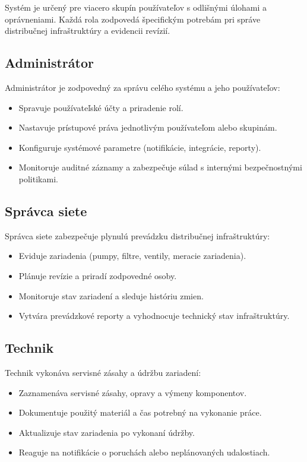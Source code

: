 Systém je určený pre viacero skupín používateľov s odlišnými úlohami a oprávneniami. Každá rola zodpovedá špecifickým potrebám pri správe distribučnej infraštruktúry a evidencii revízií.

\subsection{Administrátor}

Administrátor je zodpovedný za správu celého systému a jeho používateľov:

\begin{itemize}
    \item Spravuje používateľské účty a priradenie rolí.
    \item Nastavuje prístupové práva jednotlivým používateľom alebo skupinám.
    \item Konfiguruje systémové parametre (notifikácie, integrácie, reporty).
    \item Monitoruje auditné záznamy a zabezpečuje súlad s internými bezpečnostnými politikami.
\end{itemize}

\subsection{Správca siete}

Správca siete zabezpečuje plynulú prevádzku distribučnej infraštruktúry:

\begin{itemize}
    \item Eviduje zariadenia (pumpy, filtre, ventily, meracie zariadenia).
    \item Plánuje revízie a priradí zodpovedné osoby.
    \item Monitoruje stav zariadení a sleduje históriu zmien.
    \item Vytvára prevádzkové reporty a vyhodnocuje technický stav infraštruktúry.
\end{itemize}

\subsection{Technik}

Technik vykonáva servisné zásahy a údržbu zariadení:

\begin{itemize}
    \item Zaznamenáva servisné zásahy, opravy a výmeny komponentov.
    \item Dokumentuje použitý materiál a čas potrebný na vykonanie práce.
    \item Aktualizuje stav zariadenia po vykonaní údržby.
    \item Reaguje na notifikácie o poruchách alebo neplánovaných udalostiach.
\end{itemize}

